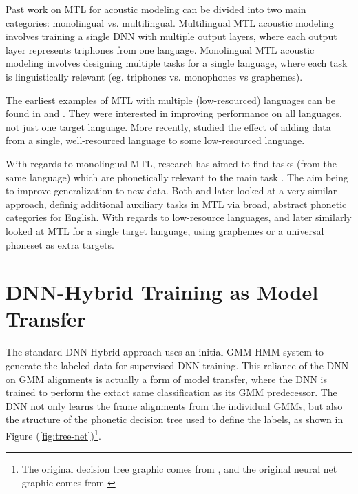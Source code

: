 \documentclass[a4paper]{article}
\begin{document}
Past work on MTL for acoustic modeling can be divided into two main categories: monolingual vs. multilingual. Multilingual MTL acoustic modeling involves training a single DNN with multiple output layers, where each output layer represents triphones from one language. Monolingual MTL acoustic modeling involves designing multiple tasks for a single language, where each task is linguistically relevant (eg. triphones vs. monophones vs graphemes).

The earliest examples of MTL with multiple (low-resourced) languages can be found in \cite{huang2013} and \cite{heigold2013}. They were interested in improving performance on all languages, not just one target language. More recently, \cite{grezl2016} studied the effect of adding data from a single, well-resourced language to some low-resourced language.

With regards to monolingual MTL, research has aimed to find tasks (from the same language) which are phonetically relevant to the main task \cite{bell2015}. The aim being to improve generalization to new data. Both \cite{seltzer2013} and later \cite{huang2015} looked at a very similar approach, definig additional auxiliary tasks in MTL via broad, abstract phonetic categories for English. With regards to low-resource languages, \cite{chen2014} and later \cite{chen2015} similarly looked at MTL for a single target language, using graphemes or a universal phoneset as extra targets.



\section{DNN-Hybrid Training as Model Transfer}

The standard DNN-Hybrid approach uses an initial GMM-HMM system to generate the labeled data for supervised DNN training. This reliance of the DNN on GMM alignments is actually a form of model transfer, where the DNN is trained to perform the extact same classification as its GMM predecessor. The DNN not only learns the frame alignments from the individual GMMs, but also the structure of the phonetic decision tree used to define the labels, as shown in Figure (\ref{fig:tree-net})\footnote{The original decision tree graphic comes from \cite{young2002}, and the original neural net graphic comes from \cite{heigold2013}}.
\end{document}

